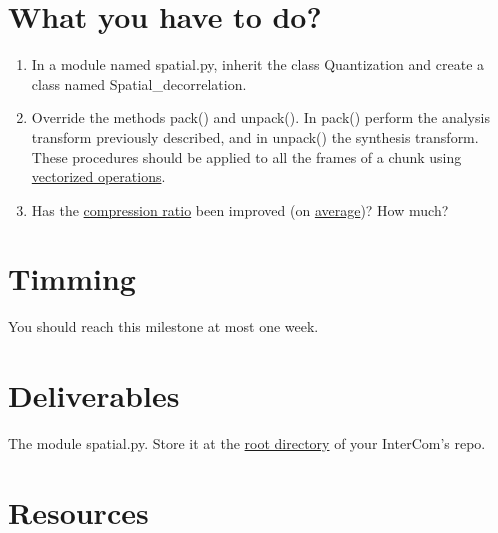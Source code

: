 \section{What you have to do?}

\begin{enumerate}
\item In a module named spatial.py, inherit the class
  Quantization and create a class named Spatial\_decorrelation.
\item Override the methods pack() and unpack(). In pack() perform the
  analysis transform previously described, and in unpack() the
  synthesis transform. These procedures should be applied to all the
  frames of a chunk using
  \href{https://www.oreilly.com/library/view/python-for-data/9781449323592/ch04.html}{vectorized
    operations}.
\item Has the
  \href{https://en.wikipedia.org/wiki/Data_compression_ratio}{compression
    ratio} been improved (on
  \href{https://en.wikipedia.org/wiki/Average}{average})? How much?
\end{enumerate}

\section{Timming}

You should reach this milestone at most one week.

\section{Deliverables}

The module spatial.py. Store it at the
\href{https://github.com/Tecnologias-multimedia/intercom}{root
  directory} of your InterCom's repo.

\section{Resources}


